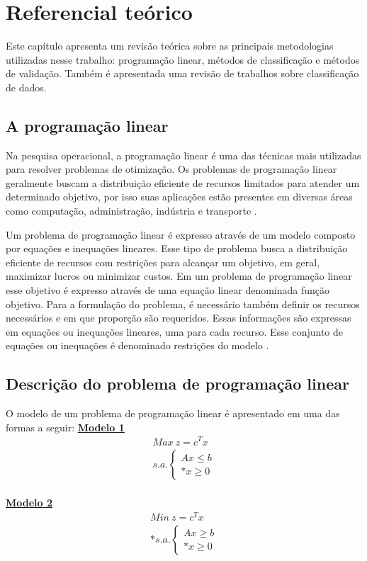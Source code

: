 \chapter{Referencial teórico}
Este capítulo apresenta um revisão teórica sobre as principais metodologias utilizadas nesse trabalho: programação linear, métodos de classificação e métodos de validação. Também é apresentada uma revisão de trabalhos sobre classificação de dados.  

\section{A programação linear}
Na pesquisa operacional, a programação linear é uma das técnicas mais utilizadas para resolver problemas de otimização. Os problemas de programação linear geralmente buscam a distribuição eficiente de recursos limitados para atender um determinado objetivo, por isso suas aplicações estão presentes em diversas áreas como computação, administração, indústria e transporte \cite{Engecom}.

Um problema de programação linear é expresso através de um modelo composto por equações e inequações lineares. Esse tipo de problema busca a distribuição eficiente de recursos com restrições para alcançar um objetivo, em geral, maximizar lucros ou minimizar custos. Em um problema de programação linear esse objetivo é expresso através de uma equação linear denominada função objetivo. Para a formulação do problema, é necessário também definir os recursos necessários e em que proporção são requeridos. Essas informações são expressas em equações ou inequações lineares, uma para cada recurso. Esse conjunto de equações ou inequações é denominado restrições do modelo \cite{Engecom}.

\section{Descrição do problema de programação linear}
O modelo de um problema de programação linear é apresentado em uma das formas a seguir:
\noindent
\underline{\bf Modelo 1}
\begin{eqnarray}
    Max\ z = c^{T}x \label{eq:obj1}
\\s.a.\left\{\begin{matrix}
Ax\leq b\\*x\geq 0
\end{matrix}\right.\label{eq:rest1}
\end{eqnarray}
\\
\noindent
\underline{\bf Modelo 2}
\begin{eqnarray}
Min\ z = c^{T}x \label{eq:obj2}
\\*s.a.\left\{\begin{matrix}
Ax\geq  b\\*x\geq 0 
\end{matrix}\right. \label{eq:rest2}
\end{eqnarray}

